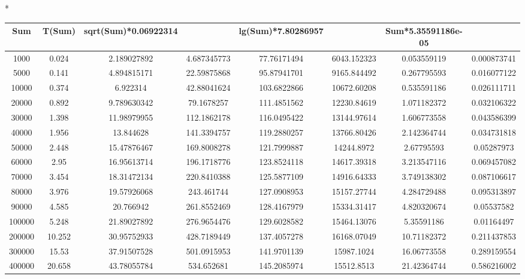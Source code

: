 \documentclass{article}
\begin{document}
    \begin{flushleft}
        \begin{adjustbox}{width=1.1\textwidth,center=\textwidth}
        *\begin{tabular}{|c|c|c|c|c|c|c|c|}
        \hline
        {Sum} & {T(Sum)} & {sqrt(Sum)*0.06922314} &{} & {lg(Sum)*7.80286957} &{} &{Sum*5.35591186e-05}&{}\\
        \hline
        1000	&0.024&	2.189027892&4.687345773&	77.76171494&	6043.152323&	0.053559119&	0.000873741\\\hline
        5000&	0.141&	4.894815171&22.59875868	&95.87941701&	9165.844492	&0.267795593	&0.016077122\\\hline
        10000&	0.374&	6.922314&   42.88041624	&103.6822866&	10672.60208	&0.535591186	&0.026111711\\\hline
        20000&	0.892&	9.789630342&79.1678257	&111.4851562&	12230.84619&	1.071182372	&0.032106322\\\hline
        30000&	1.398&	11.98979955&	112.1862178&116.0495422&	13144.97614&	1.606773558&	0.043586399\\\hline
        40000&	1.956&	13.844628	&141.3394757&	119.2880257	&13766.80426&	2.142364744	&0.034731818\\\hline
        50000&	2.448&	15.47876467	&169.8008278&	121.7999887&	14244.8972&	2.67795593	&0.05287973\\\hline
        60000&	2.95&	16.95613714	&196.1718776&	123.8524118&	14617.39318&	3.213547116&	0.069457082\\\hline
        70000&	3.454&	18.31472134	&220.8410388&	125.5877109&	14916.64333&	3.749138302	&0.087106617\\\hline
        80000&	3.976&	19.57926068	&243.461744	&127.0908953&	15157.27744	&4.284729488	&0.095313897\\\hline
        90000&	4.585&	20.766942	&261.8552469&	128.4167979&	15334.31417&	4.820320674&	0.05537582\\\hline
        100000&	5.248&	21.89027892	&276.9654476&	129.6028582	&15464.13076&	5.35591186	&0.01164497\\\hline
        200000&	10.252&	30.95752933&	428.7189449&137.4057278	&16168.07049&	10.71182372	&0.211437853\\\hline
        300000&	15.53&	37.91507528&	501.0915953&141.9701139	&15987.1024	&16.06773558	&0.289159554\\\hline
        400000&	20.658&	43.78055784	&534.652681	&145.2085974&	15512.8513	&21.42364744	&0.586216002\\\hline

\end{tabular}
\end{adjustbox}
\end{flushleft}
\end{document}
